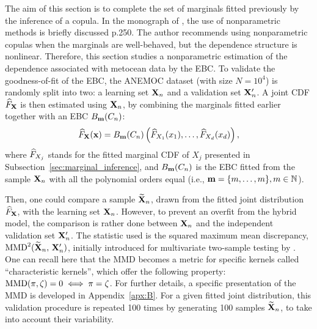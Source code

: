 The aim of this section is to complete the set of marginals fitted previously by the inference of a copula. 
In the monograph of \citet{joe2011dependence}, the use of nonparametric methods is briefly discussed p.250. 
The author recommends using nonparametric copulas when the marginals are well-behaved, but the dependence structure is nonlinear. 
Therefore, this section studies a nonparametric estimation of the dependence associated with metocean data by the EBC. 
To validate the goodness-of-fit of the EBC, the ANEMOC dataset (with size $N=10^4$) is randomly split into two: a learning set ${\bf X}_n$ and a validation set ${\bf X}_n'$. 
A joint CDF $\widehat{F}_{\bf X}$ is then estimated using ${\bf X}_n$, by combining the marginals fitted earlier together with an EBC $B_{{\bf m}}(C_n)$: 
\begin{equation}
    \widehat{F}_{\bf X}({\bf x}) = B_{{\bf m}}(C_n)\left(\widehat{F}_{X_1}(x_1), \dots, \widehat{F}_{X_d}(x_d)\right),
\end{equation}
where $\widehat{F}_{X_j}$ stands for the fitted marginal CDF of $X_j$ presented in Subsection~\ref{sec:marginal_inference}, 
and $B_{{\bf m}}(C_n)$ is the EBC fitted from the sample ${\bf X}_n$ with all the polynomial orders equal (i.e., ${\bf m} = \{m, \dots, m\}, m\in\mathbb{N}$).

Then, one could compare a sample $\widetilde{{\bf X}}_n$, drawn from the fitted joint distribution $\widehat{F}_{\bf X}$, with the learning set ${\bf X}_n$. 
However, to prevent an overfit from the hybrid model, the comparison is rather done between ${\bf X}_n$ and the independent validation set ${\bf X}_n'$. 
The statistic used is the squared maximum mean discrepancy, $\mathrm{MMD}^2(\widetilde{{\bf X}}_n, \, {\bf X}_n')$, initially introduced for multivariate two-sample testing by \cite{gretton_2006}. 
One can recall here that the MMD becomes a metric for specific kernels called “characteristic kernels”, which offer the following property: $\mathrm{MMD}(\pi, \zeta)=0 \iff \pi = \zeta$. 
For further details, a specific presentation of the MMD is developed in Appendix~\ref{apx:B}. 
For a given fitted joint distribution, this validation procedure is repeated 100 times by generating 100 samples $\widetilde{{\bf X}}_n$, to take into account their variability. 

